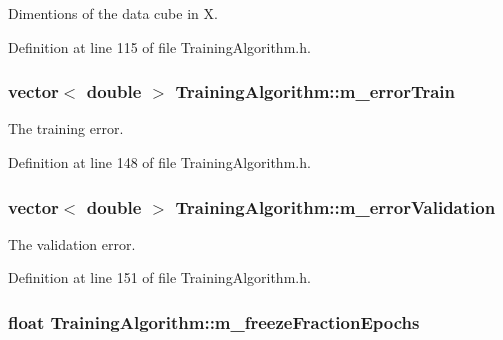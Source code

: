 Dimentions of the data cube in X. 



Definition at line 115 of file Training\+Algorithm.\+h.

\subsubsection[{\texorpdfstring{m\+\_\+error\+Train}{m_errorTrain}}]{\setlength{\rightskip}{0pt plus 5cm}vector$<$ double $>$ Training\+Algorithm\+::m\+\_\+error\+Train\hspace{0.3cm}{\ttfamily [private]}}\hypertarget{classTrainingAlgorithm_a4e1bc94ebf1991d93123ef7ac6d76dd3}{}\label{classTrainingAlgorithm_a4e1bc94ebf1991d93123ef7ac6d76dd3}


The training error. 



Definition at line 148 of file Training\+Algorithm.\+h.

\subsubsection[{\texorpdfstring{m\+\_\+error\+Validation}{m_errorValidation}}]{\setlength{\rightskip}{0pt plus 5cm}vector$<$ double $>$ Training\+Algorithm\+::m\+\_\+error\+Validation\hspace{0.3cm}{\ttfamily [private]}}\hypertarget{classTrainingAlgorithm_abb9b3684f519dc1e262921b9ea4e5c95}{}\label{classTrainingAlgorithm_abb9b3684f519dc1e262921b9ea4e5c95}


The validation error. 



Definition at line 151 of file Training\+Algorithm.\+h.

\subsubsection[{\texorpdfstring{m\+\_\+freeze\+Fraction\+Epochs}{m_freezeFractionEpochs}}]{\setlength{\rightskip}{0pt plus 5cm}float Training\+Algorithm\+::m\+\_\+freeze\+Fraction\+Epochs\hspace{0.3cm}{\ttfamily [private]}}\hypertarget{classTrainingAlgorithm_a7d5e69b50a5321abc2c0f56b61d58732}{}\label{classTrainingAlgorithm_a7d5e69b50a5321abc2c0f56b61d58732}


